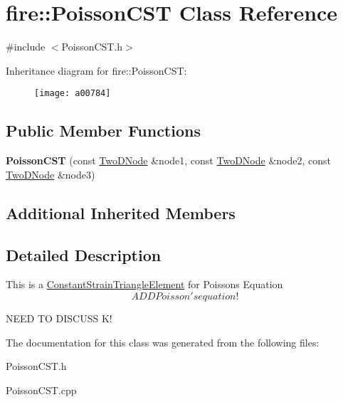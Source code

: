 \hypertarget{a00784}{}\section{fire\+:\+:Poisson\+C\+ST Class Reference}
\label{a00784}


{\ttfamily \#include $<$Poisson\+C\+S\+T.\+h$>$}

Inheritance diagram for fire\+:\+:Poisson\+C\+ST\+:\begin{figure}[H]
\begin{center}
\leavevmode
\texttt{[image: a00784]}
\end{center}
\end{figure}
\subsection*{Public Member Functions}
\begin{DoxyCompactItemize}
\item 
\mbox{\label{a00784_ab45e61d417f5bbf0803d884bfb2db07f}} 
{\bfseries Poisson\+C\+ST} (const \hyperlink{a00189_a92dafcc05a788e1065a5792b67f0f70e}{Two\+D\+Node} \&node1, const \hyperlink{a00189_a92dafcc05a788e1065a5792b67f0f70e}{Two\+D\+Node} \&node2, const \hyperlink{a00189_a92dafcc05a788e1065a5792b67f0f70e}{Two\+D\+Node} \&node3)
\end{DoxyCompactItemize}
\subsection*{Additional Inherited Members}


\subsection{Detailed Description}
This is a \hyperlink{a00764}{Constant\+Strain\+Triangle\+Element} for Poisson\textquotesingle{}s Equation \[ ADD Poisson's equation! \]

N\+E\+ED TO D\+I\+S\+C\+U\+SS K! 

The documentation for this class was generated from the following files\+:\begin{DoxyCompactItemize}
\item 
Poisson\+C\+S\+T.\+h\item 
Poisson\+C\+S\+T.\+cpp\end{DoxyCompactItemize}
